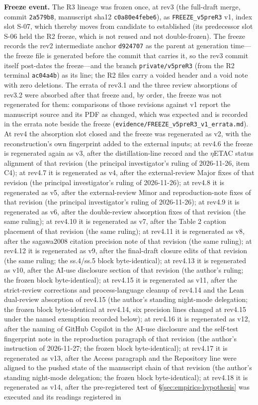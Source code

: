 \documentclass[11pt,a4paper]{article}
\newcommand{\thm}[1]{\nolinkurl{#1}}
\begin{document}
\textbf{Freeze event.} The R3 lineage was frozen once, at rev3 (the full-draft merge, commit \texttt{2a579b8}, manuscript sha12 \texttt{c0a80e4febe6}), as \thm{FREEZE_v5preR3} v1, index slot S-07, which thereby moves from candidate to established (its predecessor slot S-06 held the R2 freeze, which is not reused and not double-frozen). The freeze records the rev2 intermediate anchor \texttt{d924707} as the parent at generation time---the freeze file is generated before the commit that carries it, so the rev3 commit itself post-dates the freeze---and the branch \texttt{private/v5preR3} (from the R2 terminal \texttt{ac04a4b}) as its line; the R2 files carry a voided header and a void note with zero deletions. The errata of rev3.1 and the three review absorptions of rev3.2 were absorbed after that freeze and, by order, the freeze was not regenerated for them: comparisons of those revisions against v1 report the manuscript source and its PDF as changed, which was expected and is recorded in the errata note beside the freeze (\thm{evidence/FREEZE_v5preR3_v1_errata.md}). At rev4 the absorption slot closed and the freeze was regenerated as v2, with the reconstruction's own fingerprint added to the external inputs; at rev4.6 the freeze is regenerated again as v3, after the distillation-line record and the $\eta$ETAC status alignment of that revision (the principal investigator's ruling of 2026-11-26, item C4); at rev4.7 it is regenerated as v4, after the external-review Major fixes of that revision (the principal investigator's ruling of 2026-11-26); at rev4.8 it is regenerated as v5, after the external-review Minor and reproduction-note fixes of that revision (the principal investigator's ruling of 2026-11-26); at rev4.9 it is regenerated as v6, after the double-review absorption fixes of that revision (the same ruling); at rev4.10 it is regenerated as v7, after the Table 2 caption placement of that revision (the same ruling); at rev4.11 it is regenerated as v8, after the sagawa2008 citation precision note of that revision (the same ruling); at rev4.12 it is regenerated as v9, after the final-draft closure edits of that revision (the same ruling; the ss.4/ss.5 block byte-identical); at rev4.13 it is regenerated as v10, after the AI-use disclosure section of that revision (the author's ruling; the frozen block byte-identical); at rev4.15 it is regenerated as v11, after the strict-review corrections and process-language cleanup of rev4.14 and the Lean dual-review absorption of rev4.15 (the author's standing night-mode delegation; the frozen block byte-identical at rev4.14, six precision lines changed at rev4.15 under the named exemption recorded below); at rev4.16 it is regenerated as v12, after the naming of GitHub Copilot in the AI-use disclosure and the self-test fingerprint note in the reproduction paragraph of that revision (the author's instruction of 2026-11-27; the frozen block byte-identical); at rev4.17 it is regenerated as v13, after the Access paragraph and the Repository line were aligned to the pushed state of the manuscript chain of that revision (the author's standing night-mode delegation; the frozen block byte-identical); at rev4.18 it is regenerated as v14, after the pre-registered test of \S\ref{sec:empirics-hypothesis} was executed and its readings registered in 
\end{document}

